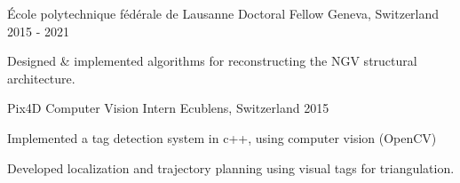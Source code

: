 \begin{cventries}


\cventry
{École polytechnique fédérale de Lausanne}
{Doctoral Fellow}
{Geneva, Switzerland}
{2015 - 2021}
{
\begin{cvitems}
\item{Designed \& implemented algorithms for reconstructing the NGV structural architecture.}
\end{cvitems}
}



\cventry
{Pix4D} %
{Computer Vision Intern} %
{Ecublens, Switzerland} %
{2015 } %
{ %
\begin{cvitems}
\item {Implemented a tag detection system in c++, using computer vision (OpenCV)}
\item {Developed localization and trajectory planning using visual tags for triangulation.}
\end{cvitems}
}


\end{cventries}
